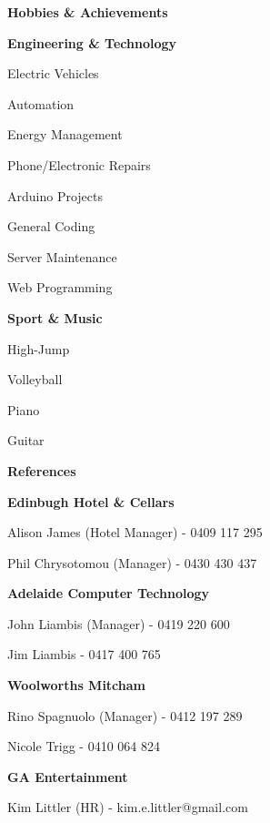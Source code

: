 \documentclass[a4paper,12pt,final]{memoir}
\newcommand{\CVSection}[1]
	{\Large\textbf{#1}\par
	\vspace{0.5em}\normalsize\normalfont}
\newcommand{\CVItem}[1]
	{\textbf{\color{Maroon} #1}}
\begin{document}
\CVSection{Hobbies \& Achievements}
\CVItem{Engineering \& Technology}
\begin{multicols}{2}
\begin{compactitem}[\color{Maroon}$\circ$]
	\item Electric Vehicles 
	\item Automation
	\item Energy Management
	\item Phone/Electronic Repairs
	\item Arduino Projects
	\item General Coding
	\item Server Maintenance
	\item Web Programming
\end{compactitem}
\end{multicols}
\vspace{1em}

\CVItem{Sport \& Music}
\begin{multicols}{3}
\begin{compactitem}[\color{Maroon}$\circ$]
	\item High-Jump
	\item Volleyball 
	\item Piano
	\item Guitar
\end{compactitem}
\end{multicols}
\vspace{1.5em}

\CVSection{References}
\CVItem{Edinbugh Hotel \& Cellars}
\begin{compactitem}[\color{Maroon}$\circ$]
	\item Alison James (Hotel Manager) - 0409 117 295
	\item Phil Chrysotomou (Manager) - 0430 430 437
\end{compactitem}
\vspace{1em}

\CVItem{Adelaide Computer Technology}
\begin{compactitem}[\color{Maroon}$\circ$]
	\item John Liambis (Manager) - 0419 220 600
	\item Jim Liambis - 0417 400 765
\end{compactitem}
\vspace{1em}

\CVItem{Woolworths Mitcham}
\begin{compactitem}[\color{Maroon}$\circ$]
	\item Rino Spagnuolo (Manager) - 0412 197 289
	\item Nicole Trigg - 0410 064 824
\end{compactitem}
\vspace{1em}

\CVItem{GA Entertainment}
\begin{compactitem}[\color{Maroon}$\circ$]
	\item Kim Littler (HR) - kim.e.littler@gmail.com
\end{compactitem}

\end{document}
